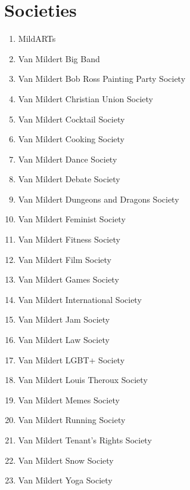 \documentclass[12pt]{article}  %
\begin{document}
\section{Societies}
\begin{enumerate}[]
    \item MildARTs
    \item Van Mildert Big Band
    \item Van Mildert Bob Ross Painting Party Society
    \item Van Mildert Christian Union Society
    \item Van Mildert Cocktail Society
    \item Van Mildert Cooking Society
    \item Van Mildert Dance Society
    \item Van Mildert Debate Society
    \item Van Mildert Dungeons and Dragons Society
    \item Van Mildert Feminist Society
    \item Van Mildert Fitness Society
    \item Van Mildert Film Society
    \item Van Mildert Games Society
    \item Van Mildert International Society
    \item Van Mildert Jam Society
    \item Van Mildert Law Society
    \item Van Mildert LGBT+ Society
    \item Van Mildert Louis Theroux Society
    \item Van Mildert Memes Society
    \item Van Mildert Running Society
    \item Van Mildert Tenant’s Rights Society
    \item Van Mildert Snow Society
    \item Van Mildert Yoga Society
\end{enumerate}
\end{document}

